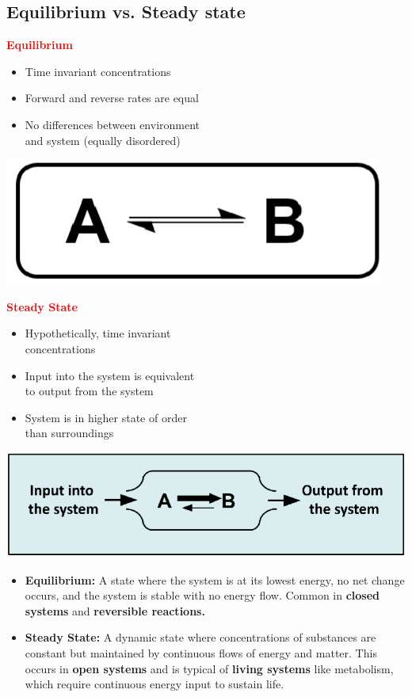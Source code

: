 \documentclass[10pt]{article}
\begin{document}
\pagebreak
\setlength{\columnsep}{1cm}
\subsection*{Equilibrium vs. Steady state}
\begin{multicols}{2}
\textcolor{red}{\textbf{Equilibrium}}
\begin{itemize}
    \item Time invariant concentrations
    \item Forward and reverse rates are equal
    \item No differences between environment\\
     and system (equally disordered)
\end{itemize}
\begin{center}
    \includegraphics[scale=0.3]{L4_4.png}
\end{center}
\columnbreak
\textcolor{red}{\textbf{Steady State}}
\begin{itemize}
    \item Hypothetically, time invariant\\
    concentrations
    \item Input into the system is equivalent\\
    to output from the system
    \item System is in higher state of order\\
    than surroundings
\end{itemize}
\begin{center}
    \includegraphics[scale=0.3]{L4_5.png}
\end{center}
\end{multicols}
\begin{itemize}
    \item \textbf{Equilibrium:} A state where the system is at its lowest energy, no net change occurs, and the system is stable with no energy flow.  Common in \textbf{closed systems} and \textbf{reversible reactions.}
    \item \textbf{Steady State:} A dynamic state where concentrations of substances are constant but maintained by continuous flows of energy and matter.  This occurs in \textbf{open systems} and is typical of \textbf{living systems} like metabolism, which require continuous energy input to sustain life.
\end{itemize}
\end{document}
